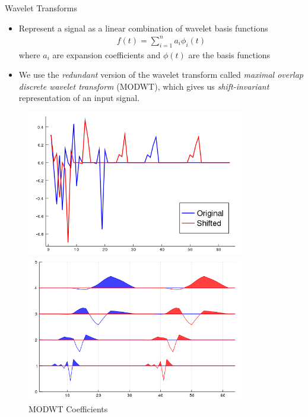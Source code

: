 \documentclass[aspectratio=169]{beamer}
\begin{document}
\begin{frame}{Wavelet Transforms}
\begin{itemize}
    \item Represent a signal as a linear combination of wavelet basis functions
        \begin{align*}
            f(t) = \sum_{i=1}^n a_i \phi_i(t)
        \end{align*}
    where $a_i$ are expansion coefficients and $\phi(t)$ are the basis functions
    \item We use the \emph{redundant} version of the wavelet transform called \emph{maximal overlap discrete wavelet transform} (MODWT), which gives us \emph{shift-invariant} representation of an input signal.
\end{itemize}

\begin{figure} 
    \begin{minipage}[b]{0.45\textwidth}
        \centering
        \includegraphics[width=0.85\textwidth,
            height=0.25\textheight]{shift_inv_dwt.png}
        \caption{Discrete Wavelet Transform Coefficients}
    \end{minipage}
     \hfill
    \begin{minipage}[b]{0.45\textwidth}
        \centering
        \includegraphics[width=0.85\textwidth,
            height=0.25\textheight]{shift_inv_modwt.png}
        \caption{MODWT Coefficients}
     \end{minipage}
\end{figure}
\end{frame}
\end{document}
